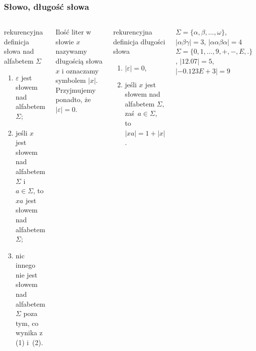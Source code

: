 \documentclass[8pt]{beamer}
\begin{document}

\begin{frame}[t]
\frametitle{Słowo, długość słowa} 
\begin{columns}
\begin{alertblock}{rekurencyjna definicja słowa nad alfabetem $\Sigma$}
\begin{enumerate}
\item $\varepsilon$ jest słowem nad alfabetem $\Sigma$; 
\item jeśli $x$ jest słowem nad alfabetem $\Sigma$ i~$a \in \Sigma$, to $xa$ jest słowem nad alfabetem $\Sigma$;
\item nic innego nie jest słowem nad alfabetem $\Sigma$ poza tym, co wynika z (1) i~(2).
\end{enumerate}
\end{alertblock}
\pause

\begin{alertblock}{}
Ilość liter w słowie $x$ nazywamy \alert{długością słowa} $x$ i oznaczamy symbolem $|x|$. Przyjmujemy ponadto, że $|\varepsilon| = 0$.
\end{alertblock}
\pause

\begin{alertblock}{rekurencyjna definicja długości słowa}
\begin{enumerate}
\setlength{\itemsep}{0mm}
\item $|\varepsilon| = 0$,
\item jeśli $x$ jest słowem nad alfabetem $\Sigma$, zaś~$a \in \Sigma$, to $|xa| = 1 + |x|$.
\end{enumerate}
\end{alertblock}

\begin{exampleblock}{}
$\Sigma = \{\alpha,\beta,\dots,\omega\}$,\; $|\alpha\beta\gamma| = 3$,\; $|\alpha\alpha\beta\alpha| = 4$\\
$\Sigma = \{0,1,\dots,9,+,-,E,.\}$,\; $|12.07| = 5$,\; $|-0.123E\!+\!3| = 9$
\end{exampleblock}
\end{columns}
\end{frame}

\end{document}
